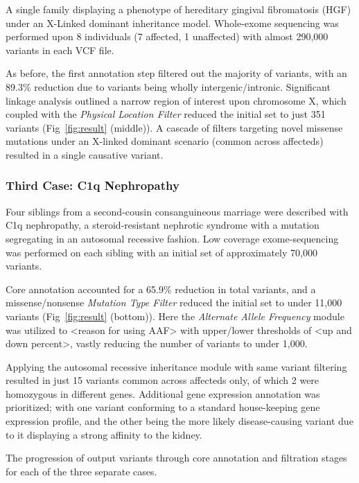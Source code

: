 A single family displaying a phenotype of hereditary gingival fibromatosis (HGF) under an X-Linked dominant inheritance model. Whole-exome sequencing was performed upon 8 individuals (7 affected, 1 unaffected) with almost 290,000 variants in each VCF file. 

As before, the first annotation step filtered out the majority of variants, with an 89.3\% reduction due to variants being wholly intergenic/intronic. Significant linkage analysis outlined a narrow region of interest upon chromosome X, which coupled with the \textit{Physical Location Filter} reduced the initial set to just 351 variants (Fig~\ref{fig:result} (middle)). A cascade of filters targeting novel missense mutations under an X-linked dominant scenario (common across affecteds) resulted in a single causative variant.


\subsubsection{Third Case: C1q Nephropathy}

Four siblings from a second-cousin consanguineous marriage were described with C1q nephropathy, a steroid-resistant nephrotic syndrome with a mutation segregating in an autosomal recessive fashion. Low coverage exome-sequencing was performed on each sibling with an initial set of approximately 70,000 variants. 

Core annotation accounted for a 65.9\% reduction in total variants, and a missense/nonsense \textit{Mutation Type Filter} reduced the initial set to under 11,000 variants (Fig~\ref{fig:result} (bottom)). Here the \textit{Alternate Allele Frequency} module was utilized to <reason for using AAF> with upper/lower thresholds of <up and down percent>, vastly reducing the number of variants to under 1,000. 

Applying the autosomal recessive inheritance module with same variant filtering resulted in just 15 variants common across affecteds only, of which 2 were homozygous in different genes. Additional gene expression annotation was prioritized; with one variant conforming to a standard house-keeping gene expression profile, and the other being the more likely disease-causing variant due to it displaying a strong affinity to the kidney.


{The progression of output variants through core annotation and filtration stages for each of the three separate cases.}

